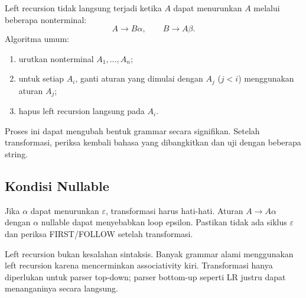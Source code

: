 Left recursion tidak langsung terjadi ketika \(A\) dapat menurunkan
\(A\) melalui beberapa nonterminal:
\[
A \to B\alpha, \qquad B \to A\beta.
\]
Algoritma umum:
\begin{enumerate}[label=\arabic*.,leftmargin=*]
  \item urutkan nonterminal \(A_1, \ldots, A_n\);
  \item untuk setiap \(A_i\), ganti aturan yang dimulai dengan
        \(A_j\) (\(j < i\)) menggunakan aturan \(A_j\);
  \item hapus left recursion langsung pada \(A_i\).
\end{enumerate}

Proses ini dapat mengubah bentuk grammar secara signifikan. Setelah
transformasi, periksa kembali bahasa yang dibangkitkan dan uji dengan
beberapa string.

\subsection{Kondisi Nullable}

Jika \(\alpha\) dapat menurunkan \(\varepsilon\), transformasi harus
hati-hati. Aturan \(A \to A\alpha\) dengan \(\alpha\) nullable dapat
menyebabkan loop epsilon. Pastikan tidak ada siklus
\(\varepsilon\) dan periksa FIRST/FOLLOW setelah transformasi.

\begin{infobox}
Left recursion bukan kesalahan sintaksis. Banyak grammar alami
menggunakan left recursion karena mencerminkan associativity kiri.
Transformasi hanya diperlukan untuk parser top-down; parser
bottom-up seperti LR justru dapat menanganinya secara langsung.
\end{infobox}
